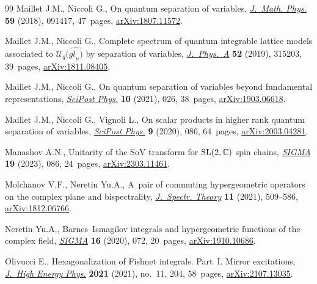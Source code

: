 \documentclass[10pt,a4paper]{amsart}
\numberwithin{equation}{section}
\begin{document}
\begin{thebibliography}{99}
Maillet J.M., Niccoli G., On quantum separation of variables,
 \href{https://doi.org/10.1063/1.5050989}{\textit{J.~Math. Phys.}} \textbf{59}
 (2018), 091417, 47~pages,
 \href{http://arxiv.org/abs/1807.11572}{arXiv:1807.11572}.

Maillet J.M., Niccoli G., Complete spectrum of quantum integrable lattice
 models associated to {$\mathcal{U}_q(\widehat{{gl}_n)}$} by separation of
 variables,
 \href{https://doi.org/10.1088/1751-8121/ab2930}{\textit{J.~Phys.~A}}
 \textbf{52} (2019), 315203, 39~pages,
 \href{http://arxiv.org/abs/1811.08405}{arXiv:1811.08405}.

Maillet J.M., Niccoli G., On quantum separation of variables beyond fundamental
 representations,
 \href{https://doi.org/10.21468/scipostphys.10.2.026}{\textit{SciPost Phys.}}
 \textbf{10} (2021), 026, 38~pages,
 \href{http://arxiv.org/abs/1903.06618}{arXiv:1903.06618}.

Maillet J.M., Niccoli G., Vignoli L., On scalar products in higher rank quantum
 separation of variables,
 \href{https://doi.org/10.21468/SciPostPhys.9.6.086}{\textit{SciPost Phys.}}
 \textbf{9} (2020), 086, 64~pages,
 \href{http://arxiv.org/abs/2003.04281}{arXiv:2003.04281}.

Manashov A.N., Unitarity of the {S}o{V} transform for {${\rm SL}(2,\mathbb C)$}
 spin chains, \href{https://doi.org/10.3842/SIGMA.2023.086}{\textit{SIGMA}}
 \textbf{19} (2023), 086, 24~pages,
 \href{http://arxiv.org/abs/2303.11461}{arXiv:2303.11461}.

Molchanov V.F., Neretin Yu.A., A~pair of commuting hypergeometric operators on
 the complex plane and bispectrality,
 \href{https://doi.org/10.4171/jst/349}{\textit{J.~Spectr. Theory}}
 \textbf{11} (2021), 509--586,
 \href{http://arxiv.org/abs/1812.06766}{arXiv:1812.06766}.

Neretin Yu.A., Barnes--{I}smagilov integrals and hypergeometric functions of the
 complex field, \href{https://doi.org/10.3842/SIGMA.2020.072}{\textit{SIGMA}}
 \textbf{16} (2020), 072, 20~pages,
 \href{http://arxiv.org/abs/1910.10686}{arXiv:1910.10686}.

Olivucci E., Hexagonalization of {F}ishnet integrals. {P}art~{I}. {M}irror
 excitations, \href{https://doi.org/10.1007/jhep11(2021)204}{\textit{J.~High
 Energy Phys.}} \textbf{2021} (2021), no.~11, 204, 58~pages,
 \href{http://arxiv.org/abs/2107.13035}{arXiv:2107.13035}.


\end{thebibliography}
\end{document}
